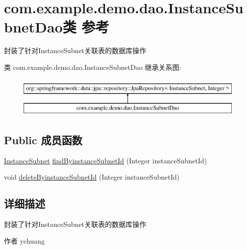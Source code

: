 \hypertarget{interfacecom_1_1example_1_1demo_1_1dao_1_1_instance_subnet_dao}{}\section{com.\+example.\+demo.\+dao.\+Instance\+Subnet\+Dao类 参考}
\label{interfacecom_1_1example_1_1demo_1_1dao_1_1_instance_subnet_dao}


封装了针对\+Instance\+Subnet关联表的数据库操作  


类 com.\+example.\+demo.\+dao.\+Instance\+Subnet\+Dao 继承关系图\+:\begin{figure}[H]
\begin{center}
\leavevmode
\includegraphics[height=2.000000cm]{interfacecom_1_1example_1_1demo_1_1dao_1_1_instance_subnet_dao}
\end{center}
\end{figure}
\subsection*{Public 成员函数}
\begin{DoxyCompactItemize}
\item 
\mbox{\hyperlink{classcom_1_1example_1_1demo_1_1modular_1_1_instance_subnet}{Instance\+Subnet}} \mbox{\hyperlink{interfacecom_1_1example_1_1demo_1_1dao_1_1_instance_subnet_dao_ad06fe557d31588942eaa7986161b2c38}{find\+Byinstance\+Subnet\+Id}} (Integer instance\+Subnet\+Id)
\item 
void \mbox{\hyperlink{interfacecom_1_1example_1_1demo_1_1dao_1_1_instance_subnet_dao_aff395ccfe0785529588e351e6d77f533}{delete\+Byinstance\+Subnet\+Id}} (Integer instance\+Subnet\+Id)
\end{DoxyCompactItemize}


\subsection{详细描述}
封装了针对\+Instance\+Subnet关联表的数据库操作 

\begin{DoxyAuthor}{作者}
ychuang 
\end{DoxyAuthor}


